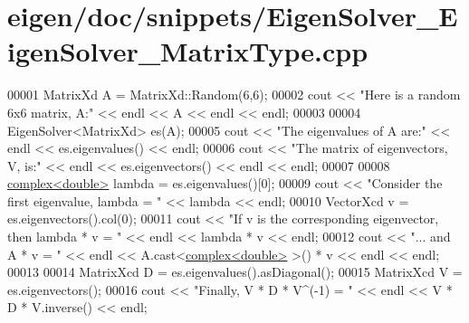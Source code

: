 \hypertarget{eigen_2doc_2snippets_2_eigen_solver___eigen_solver___matrix_type_8cpp_source}{}\section{eigen/doc/snippets/\+Eigen\+Solver\+\_\+\+Eigen\+Solver\+\_\+\+Matrix\+Type.cpp}
\label{eigen_2doc_2snippets_2_eigen_solver___eigen_solver___matrix_type_8cpp_source}

\begin{DoxyCode}
00001 MatrixXd A = MatrixXd::Random(6,6);
00002 cout << \textcolor{stringliteral}{"Here is a random 6x6 matrix, A:"} << endl << A << endl << endl;
00003 
00004 EigenSolver<MatrixXd> es(A);
00005 cout << \textcolor{stringliteral}{"The eigenvalues of A are:"} << endl << es.eigenvalues() << endl;
00006 cout << \textcolor{stringliteral}{"The matrix of eigenvectors, V, is:"} << endl << es.eigenvectors() << endl << endl;
00007 
00008 \hyperlink{structcomplex}{complex<double>} lambda = es.eigenvalues()[0];
00009 cout << \textcolor{stringliteral}{"Consider the first eigenvalue, lambda = "} << lambda << endl;
00010 VectorXcd v = es.eigenvectors().col(0);
00011 cout << \textcolor{stringliteral}{"If v is the corresponding eigenvector, then lambda * v = "} << endl << lambda * v << endl;
00012 cout << \textcolor{stringliteral}{"... and A * v = "} << endl << A.cast<\hyperlink{structcomplex}{complex<double>} >() * v << endl << endl;
00013 
00014 MatrixXcd D = es.eigenvalues().asDiagonal();
00015 MatrixXcd V = es.eigenvectors();
00016 cout << \textcolor{stringliteral}{"Finally, V * D * V^(-1) = "} << endl << V * D * V.inverse() << endl;
\end{DoxyCode}

